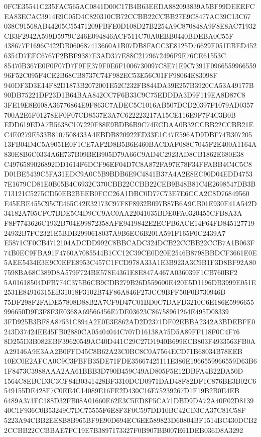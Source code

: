 \documentclass[UTF8,fontset=fandol,zihao=-4,a4paper]{ctexart}
\begin{document}
{{0FCE35541C235FAC565AC0841D00C17B4B63EEDA882093839A5BF99DEEEFCEA83ECAC3914E9C05D4C820310CB72CCBB22CCBB27E9C8477AC39C13C67
038C91568AB44205C55471209FBFE0D108D27B2254A9C870848A9F8E8AC71932CB3F2942A599D5979C246E094846ACF511C70A0EBB0440BDEBA0C55F
438677F1696C422DB060687413660A1B07DB8FACC3E8125D76629E051EBED4526354D7EFC6767F2BBF9387E3AD377E88C2179672496F9E76CE61553C
85470B367E0F0F07D7F9FE379F0E6F1006730097C8E71E9C7391F096655996655996F52C095F4CE2B68CB8737C74F982EC53E56C01FF98064E83098F
940DF3D3E14F82D1873B2072001E52C232FB844DA39E257B3920CA53A49177B90DB75221DF23D1B64BAA842CC7F6B33C9C75EDDDA3D9F119EA8D87C8
3FE19E8E608A36776864E9F863C7ADEC5C1016AB507DCD20397F1079AD0357700A2E6F01278EF0F07CD8537E3A7C622223217A15CE116E9F7F4C3B0B
EDD619EDA7B5638C107220F88E9BDB6B9C74ECDAA0B32CCBB22CCBB21EC4E0279E533B8107508433A4EBDB820922ED33E1C47E596AD9DBF74B307205
13FB04D4C5A9051E0F1CE7AF2D8B5B6E460BACDAF088C7045F2E400A1164A830E8B6C0334A6E737B09BEB905D79A66C9AD4C2923AD8CB1862E680E38
C4976589026892DD1614F6DCF96EF04D7C8A872FA97E78F34FFABB4C4C5C8D01BE5439C5FA31EDC9A0C5B9BDB6E9C4841B37A4A2E8EC90D04EDD4753
7E1679CD81E0B05B4C6932C370CBB22CCBB22CEB9B48B81C4E2698547DB3B713121C5275CD50EB2BEEB0FCC26A1DBC0D77C73E7E6CCA2C8D76849560
E45EBE455C95CE465C42E32173C97F8F8932B097B87B6A9CB01E930E41A542D34182A705CFC7BDE5C4D9CC9AC0AA22041035BDE0FA0320455CFB8A3A
F8F7743626C1932B704E99872358AFE9419842E2ECFB6ACE14F64FD84512771924932B7FC2321E5BDB2990618037A9B6EC6B201A591F165F0C2439A7
E5871CF0CB4712104ADCDD992C8BBCADC324DCB22CCBB22CCB7A1B063F74B0EC9FBA91F4760A7085544B1CC12C39CE0D20E2546B8798BBDCF3661E0E
5AEE5434E3E9C0EFE8953C457C1FCD978A33A1E3B923A3C9B1F3D8BF92A807598BA68C389D8A579F724BE578E4361E8E847A467A036039F1CB760BF2
5A01618504DFB774C375B6CB9CDB279B26D559600E420E5D1196DB3999E051E2531E84916315EB31018F3102B74F86A846F273CC9BFF50F0B730946B
75DF298F2FADE57808D88B2A7CF9D47C01BD0C7DAFD3210C6E186E5996655996650D9E3F8F3E0368A69566456E7DE03623C86758961264E495D08339
3FD925B3BF8A87531C894A2E0E3E862AD2D2371DF02EBBA2342A3BDEBFE0243D37424EE45FB02880CA05404044C707D16138A75D5A89FF118F0C4F76
8D255D3B082EBF39620549AC40D441C29C27D1940B699ECB803F4933563FB0AA29146A9E3AA2B0FFD45C8B62A23C0BC8C0A7564ECD71B68034B78EEB
10EC0E2AFCA0C9C3FBFB35DE71FDE35667425111E386E1966559966559D63B61F8473C3988AAA2AA61BBB3D790B459C49AD805F5E12DBFA4B22DA50D
1564C8EBCD3C3CF84B0341428BF3310DCD0971DAD48F82DF1C876BE3B02C6549155DE428F7C0EE4C14089E16FE2D430C16E75239267D1F19B2B0E4EB
6489A371FC188D32FB08A01660E62E3C5ED8F5CA71DBD9DA72A40F02D813940C1F936C0B53249C7DC75555F6E8F3F0C597DD10BC42CD3CA37C81C58F
5223A94CBB2EE8B8B965BF9E90D694EC6EE589823D60804BF1514BC430DCB22CCBB22CCBBAE7FC19E7B3897173327F0B907BB007E61DEB036D8A3292
}}
\end{document}
